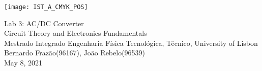 
\thispagestyle {empty}

\texttt{[image: IST\_A\_CMYK\_POS]}

\begin{center}
%
\vspace{1.0cm}

\vspace{1cm}
{\FontLb Lab 3: AC/DC Converter} \\ %
\vspace{1cm}
{\FontSn Circuit Theory and Electronics Fundamentals} \\
\vspace{1cm}
{\FontSn Mestrado Integrado Engenharia Física Tecnológica, Técnico, University of Lisbon} \\ %
\vspace{1cm}
{\FontSn Bernardo Frazão(96167), João Rebelo(96539)} \\
\vspace{1cm}
{\FontSn May 8, 2021} \\ %
%
\end{center}
